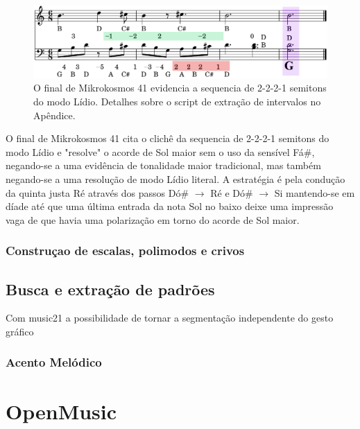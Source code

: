 \documentclass[
	12pt,				%
	openright,			%
	twoside,			%
	a4paper,			%
	english,			%
	french,				%
	spanish,			%
	brazil				%
	]{abntex2}
\begin{document}
\begin{figure}[!h]
	\caption{\label{fig_grafico}O final de Mikrokosmos 41 evidencia a sequencia de 2-2-2-1 semitons do modo Lídio. Detalhes sobre o script de extração de intervalos no Apêndice. } 
	\begin{center}
	    \includegraphics[scale=0.3]{estudosM21/mikro041FinalChords_contorno.png}
	\end{center}
\end{figure}

O final de Mikrokosmos 41 cita o clichê da sequencia de 2-2-2-1 semitons do modo Lídio e "resolve" o acorde de Sol maior sem o uso da sensível Fá\#, negando-se a uma evidência de tonalidade maior tradicional, mas também negando-se a uma resolução de modo Lídio literal. A estratégia é pela condução da quinta justa Ré através dos passos Dó\# $\rightarrow $ Ré e Dó\# $\rightarrow $ Si mantendo-se em díade até que uma última entrada da nota Sol no baixo deixe uma impressão vaga de que havia uma polarização em torno do acorde de Sol maior. 

\subsubsection{Construçao de escalas, polimodos e crivos}

\cite{ariza2011analytical}



\subsection{Busca e extração de padrões}

Com music21 a possibilidade de tornar a segmentação independente do gesto gráfico


\subsubsection{Acento Melódico}



\pagebreak
\section{OpenMusic}
\end{document}
